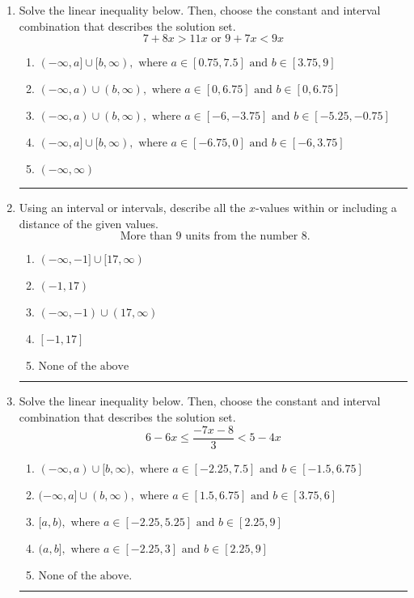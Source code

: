 \documentclass[14pt]{extbook}
\newcommand{\litem}[1]{\item#1\hspace*{-1cm}\rule{\textwidth}{0.4pt}}
\begin{document}
\begin{enumerate}
{\begin{enumerate}[label=\Alph*.]
\end{enumerate} }
\litem{
Solve the linear inequality below. Then, choose the constant and interval combination that describes the solution set.\[ 7 + 8 x > 11 x \text{ or } 9 + 7 x < 9 x \]\begin{enumerate}[label=\Alph*.]
\item \( (-\infty, a] \cup [b, \infty), \text{ where } a \in [0.75, 7.5] \text{ and } b \in [3.75, 9] \)
\item \( (-\infty, a) \cup (b, \infty), \text{ where } a \in [0, 6.75] \text{ and } b \in [0, 6.75] \)
\item \( (-\infty, a) \cup (b, \infty), \text{ where } a \in [-6, -3.75] \text{ and } b \in [-5.25, -0.75] \)
\item \( (-\infty, a] \cup [b, \infty), \text{ where } a \in [-6.75, 0] \text{ and } b \in [-6, 3.75] \)
\item \( (-\infty, \infty) \)

\end{enumerate} }
\litem{
Using an interval or intervals, describe all the $x$-values within or including a distance of the given values.\[ \text{ More than } 9 \text{ units from the number } 8. \]\begin{enumerate}[label=\Alph*.]
\item \( (-\infty, -1] \cup [17, \infty) \)
\item \( (-1, 17) \)
\item \( (-\infty, -1) \cup (17, \infty) \)
\item \( [-1, 17] \)
\item \( \text{None of the above} \)

\end{enumerate} }
\litem{
Solve the linear inequality below. Then, choose the constant and interval combination that describes the solution set.\[ 6 - 6 x \leq \frac{-7 x - 8}{3} < 5 - 4 x \]\begin{enumerate}[label=\Alph*.]
\item \( (-\infty, a) \cup [b, \infty), \text{ where } a \in [-2.25, 7.5] \text{ and } b \in [-1.5, 6.75] \)
\item \( (-\infty, a] \cup (b, \infty), \text{ where } a \in [1.5, 6.75] \text{ and } b \in [3.75, 6] \)
\item \( [a, b), \text{ where } a \in [-2.25, 5.25] \text{ and } b \in [2.25, 9] \)
\item \( (a, b], \text{ where } a \in [-2.25, 3] \text{ and } b \in [2.25, 9] \)
\item \( \text{None of the above.} \)


\end{enumerate}}
\end{enumerate}
\end{document}
